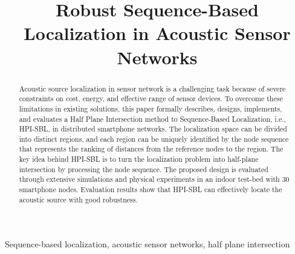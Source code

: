 \documentclass{article}
\title{Robust Sequence-Based Localization in Acoustic Sensor Networks}
\begin{document}
	\maketitle
	\begin{abstract}
		
Acoustic source localization in sensor network is a challenging task because of severe constraints on cost, energy, and effective range of sensor devices.
To overcome these limitations in existing solutions, this paper formally describes, designs, implements, and evaluates a Half Plane Intersection method to Sequence-Based Localization, i.e., HPI-SBL, in distributed smartphone networks.
The localization space can be divided into distinct regions, and each region can be uniquely identified by the node sequence that represents the ranking of distances from the reference nodes to the region.
The key idea behind HPI-SBL is to turn the localization problem into half-plane intersection by processing the node sequence.
The proposed design is evaluated through extensive simulations and physical experiments in an indoor test-bed with 30 smartphone nodes.
Evaluation results show that HPI-SBL can effectively locate the acoustic source with good robustness.
	\end{abstract}
	\begin{keywords}
Sequence-based localization, acoustic sensor networks, half plane intersection 
	\end{keywords}



%

%

	
	
	
	
	
	
\end{document}
